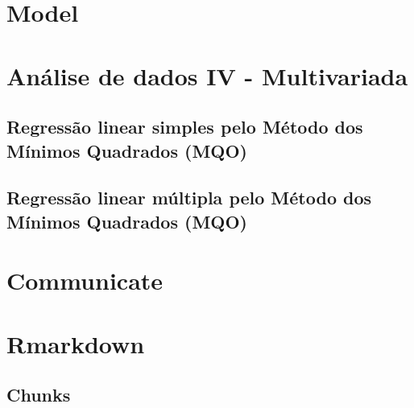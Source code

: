 \documentclass[a4paper,12pt]{article}
\begin{document}
\section{Model}
\section*{Análise de dados IV - Multivariada}
\subsection*{Regressão linear simples pelo Método dos Mínimos Quadrados (MQO)}
\subsection*{Regressão linear múltipla pelo Método dos Mínimos Quadrados (MQO)}

\section{Communicate}
\section*{Rmarkdown}
\subsection*{Chunks}
\end{document}
